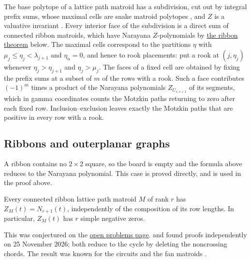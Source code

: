 \begin{proof*}
The base polytope of a lattice path matroid has a subdivision, cut out by
integral prefix sums, whose maximal cells are snake matroid polytopes
\cite{BenedettiKnauerValencia2023x}, and $Z$ is a valuative invariant
\cite{FerroniSchroter2024}.  Every interior face of the subdivision is a
direct sum of connected ribbon matroids, which have Narayana $Z$-polynomials by
\hyperref[conjRibbonMatroidZ]{the ribbon theorem} below.  The maximal cells
correspond to the partitions $\eta$ with $\mu_j\leq\eta_j<\lambda_{j+1}$ and
$\eta_n=0$, and hence to rook placements: put a rook at $(j,\eta_j)$ whenever
$\eta_j>\eta_{j+1}$ and $\eta_j>\mu_j$.  The faces of a fixed cell are
obtained by fixing the prefix sums at a subset of $m$ of the rows with a
rook.
Such a face contributes $(-1)^m$ times a product of the Narayana polynomials
$Z_{U_{s,s+1}}$ of its segments, which in gamma coordinates counts the Motzkin
paths returning to zero after each fixed row.  Inclusion--exclusion leaves
exactly the Motzkin paths that are positive in every row with a rook.
\end{proof*}


\subsection[schubertMatroidZRibbons]{Ribbons and outerplanar graphs}

A ribbon contains no $2\times2$ square, so the board is empty and the formula
above reduces to the Narayana polynomial.  This case is proved directly, and
is used in the proof above.

\begin{theorem}
\label{conjRibbonMatroidZ}\label{ribbonMatroidZNarayana}
Every connected ribbon lattice path matroid $M$ of rank $r$ has
$Z_M(t)=N_{r+1}(t)$, independently of the composition of its row lengths.  In
particular, $Z_M(t)$ has $r$ simple negative zeros.
\end{theorem}

This was conjectured on the
\hyperref[realrootedOpenProblems]{open problems page}.   and
 found proofs independently on 25 November 2026; both
reduce to the cycle by deleting the noncrossing chords.  The result was known
for the circuits \cite{ProudfootXuYoung2018} and the fan matroids
\cite{LuXieYang2018x}.

